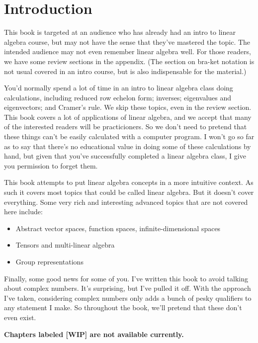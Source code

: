 \documentclass{amsbook}
\begin{document}
\setcounter{chapter}{-1}
\chapter{Introduction}

This book is targeted at an audience who has already had an intro to linear algebra course, but may not have the sense that they've mastered the topic.  The intended audience may not even remember linear algebra well.  For those readers, we have some review sections in the appendix.  (The section on bra-ket notation is not usual covered in an intro course, but is also indispensable for the material.)

You'd normally spend a lot of time in an intro to linear algebra class doing calculations, including reduced row echelon form; inverses; eigenvalues and eigenvectors; and Cramer's rule.  We skip these topics, even in the review section.  This book covers a lot of applications of linear algebra, and we accept that many of the interested readers will be practicioners.  So we don't need to pretend that these things can't be easily calculated with a computer program.  I won't go so far as to say that there's no educational value in doing some of these calculations by hand, but given that you've successfully completed a linear algebra class, I give you permission to forget them.

This book attempts to put linear algebra concepts in a more intuitive context.  As such it covers most topics that could be called linear algebra.  But it doesn't cover everything.  Some very rich and interesting advanced topics that are not covered here include:

\begin{itemize}
\item Abstract vector spaces, function spaces, infinite-dimensional spaces
\item Tensors and multi-linear algebra
\item Group representations
\end{itemize}

Finally, some good news for some of you.  I've written this book to avoid talking about complex numbers.  It's surprising, but I've pulled it off.  With the approach I've taken, considering complex numbers only adds a bunch of pesky qualifiers to any statement I make.  So throughout the book, we'll pretend that these don't even exist.

{\bfseries Chapters labeled [WIP] are not available currently.}
\end{document}
